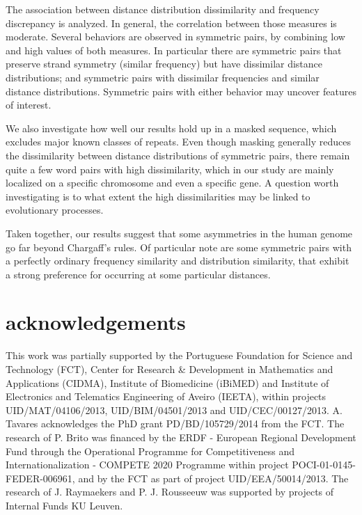 \documentclass[review,12pt]{elsarticle}
\begin{document}
The association between distance distribution
dissimilarity and frequency discrepancy is
analyzed.
In general, the correlation between those
measures is moderate. Several behaviors
are observed in symmetric pairs, by
combining low and high values of both
measures.
In particular there are symmetric pairs
that preserve strand symmetry (similar
frequency) but have dissimilar distance
distributions; and symmetric pairs with
dissimilar frequencies and similar distance
distributions. Symmetric pairs with
either behavior may uncover features of
interest.

We also investigate how well our results
hold up in a masked sequence, which
excludes major known classes of repeats.
Even though masking generally reduces the
dissimilarity between distance distributions
of symmetric pairs, there remain quite a
few word pairs with high dissimilarity,
which in our study are mainly localized
on a specific chromosome and even a
specific gene. A question worth
investigating is to what extent the high
dissimilarities may be linked to
evolutionary processes.

Taken together, our results suggest that
some asymmetries in the human genome go
far beyond Chargaff’s rules. Of particular
note are some symmetric pairs with a
perfectly ordinary frequency similarity
and distribution similarity, that exhibit
a strong preference for occurring at
some particular distances.


\section{acknowledgements}
This work was partially supported by the
Portuguese Foundation for Science and
Technology (FCT), Center for Research \&
Development in Mathematics and
Applications (CIDMA),
Institute of Biomedicine (iBiMED) and
Institute of Electronics and Telematics
Engineering of Aveiro (IEETA), within
projects UID/MAT/04106/2013,
UID/BIM/04501/2013 and
UID/CEC/00127/2013.
A. Tavares acknowledges the PhD grant
PD/BD/105729/2014 from the FCT.
The research of P. Brito was financed by
the ERDF - European Regional Development
Fund through the Operational Programme
for Competitiveness and
Internationalization - COMPETE 2020
Programme within project
POCI-01-0145-FEDER-006961, and by the FCT
as part of project UID/EEA/50014/2013.
The research of J. Raymaekers and
P. J. Rousseeuw was supported by projects
of Internal Funds KU Leuven.
\end{document}
